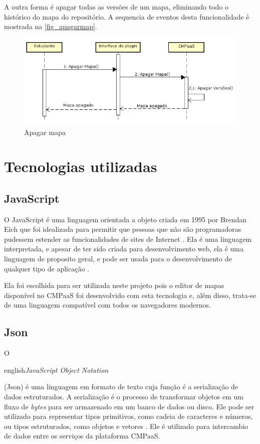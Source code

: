 \documentclass[
	12pt,				%
	openright,			%
	oneside,			%
	a4paper,			%
	english,			%
	french,				%
	spanish,			%
	brazil				%
	]{abntex2}
\begin{document}
A outra forma é apagar todas as versões de um mapa, eliminando todo o histórico do mapa do repositório. A sequencia de eventos desta funcionalidade é mostrada na \autoref{fig_apagarmap}. 

\begin{figure}[htb]
	\caption{\label{fig_apagarmap} Apagar mapa}
	\begin{center}
		\includegraphics[scale=0.5]{apagarmap.png}
	\end{center}
\end{figure}

\section{Tecnologias utilizadas}

\subsection{JavaScript}

O JavaScript é uma linguagem orientada a objeto criada em 1995 por Brendan Eich que foi idealizada para permitir que pessoas que não são programadoras pudessem estender as funcionalidades de sites de Internet \cite{Richards2010}. Ela é uma linguagem interpretada, e apesar de ter sido criada para desenvolvimento web, ela é uma linguagem de proposito geral, e pode ser usada para o desenvolvimento de qualquer tipo de aplicação \cite{flanagan2006}.

Ela foi escolhida para ser utilizada neste projeto pois o editor de mapas disponível no CMPaaS foi desenvolvido com esta tecnologia e, além disso, trata-se de uma linguagem compatível com todos os navegadores modernos.  

\subsection{Json}

O \begin{otherlanguage*}{english}\textit{JavaScript Object Notation}\end{otherlanguage*} (Json) é uma linguagem em formato de texto cuja função é a serialização de dados estruturados. A serialização é o processo de transformar objetos em um fluxo de \textit{bytes} para ser armazenado em um banco de dados ou disco. Ele pode ser utilizado para representar tipos primitivos, como cadeia de caracteres e números, ou tipos estruturados, como objetos e vetores \cite{crockford2006}. Ele é utilizado para intercambio de dados entre os serviços da plataforma CMPaaS.  
\end{document}
